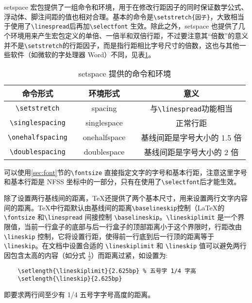 setspace 宏包提供了一组命令和环境，用于在修改行距因子的同时保证数学公式、浮动体、脚注间距的值也相对合理。基本的命令是\verb|\setstretch{因子}|，大致相当于使用了\verb|\linespread|后再加\verb|\selectfont| 生效。除此之外，setspace 也提供了几个环境用来产生宏包定义的单倍、一倍半和双倍行距，不过要注意其“倍数”的意义并不是\verb|\setstretch|的行距因子，而是指行距相比字号尺寸的倍数，这也与其他一些软件（如微软的字处理器 Word）不同，见表\ref{tab:setspace}。

\begin{table}[h]
    \centering
    \caption{setspace 提供的命令和环境}
    \label{tab:setspace}
    \linespread{1.4}
    \selectfont
    \begin{tabular}{ccccc}
        \toprule
        命令形式 && 环境形式 && 意义 \\
        \midrule 
        \verb|\setstretch| && spacing && 与\verb|\linespread|功能相当 \\ 
        \verb|\singlespacing| &&  singlespace && 正常行距 \\
        \verb|\onehalfspacing| && onehalfspace && 基线间距是字号大小的 1.5 倍 \\
        \verb|\doublespacing| && doublespace && 基线间距是字号大小的 2 倍 \\
        \bottomrule
    \end{tabular}
\end{table}

可以使用\ref{sec:font}节的\verb|\fontsize| 直接指定文字的字号和基本行距，注意这里字号和基本行距是 NFSS 坐标中的一部分，只有在使用了\verb|\selectfont|后才能生效。

除了设置两行基线间的距离，\TeX 还提供了两个基本尺寸，用来设置两行文字内容间的距离。\TeX 中行距默认由基线间的距离\verb|\baselineskip|控制（\LaTeX 的 \verb|\fontsize| 和\verb|\linespread| 间接控制 \verb|\baselineskip|。\verb|\lineskiplimit| 是一个界限值，当前一行盒子的底部与后一行盒子的顶部距离小于这个界限时，行距改由 
\verb|\lineskip| 控制，它将设置行距，使得前一行底到后一行顶的距离等于\verb|\lineskip|。在文档中设置合适的 
\verb|\lineskiplimit| 和 \verb|\lineskip| 值可以避免两行因包含太高的内容（如分式 $\displaystyle \frac{1}{2}$）而距离过紧，如设置为:

\begin{lstlisting}
    \setlength{\lineskiplimit}{2.625bp} % 五号字 1/4 字高
    \setlength{\lineskip}{2.625bp}
\end{lstlisting}

即要求两行间至少有 1/4 五号字字号高度的距离。

